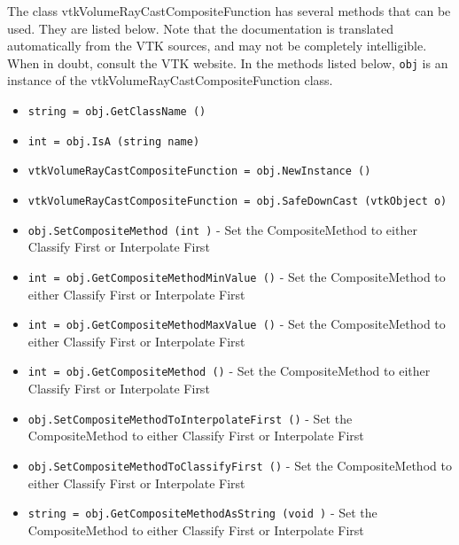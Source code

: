 The class vtkVolumeRayCastCompositeFunction has several methods that can be used.
  They are listed below.
Note that the documentation is translated automatically from the VTK sources,
and may not be completely intelligible.  When in doubt, consult the VTK website.
In the methods listed below, \verb|obj| is an instance of the vtkVolumeRayCastCompositeFunction class.
\begin{itemize}
\item  \verb|string = obj.GetClassName ()|

\item  \verb|int = obj.IsA (string name)|

\item  \verb|vtkVolumeRayCastCompositeFunction = obj.NewInstance ()|

\item  \verb|vtkVolumeRayCastCompositeFunction = obj.SafeDownCast (vtkObject o)|

\item  \verb|obj.SetCompositeMethod (int )| -  Set the CompositeMethod to either Classify First or Interpolate First

\item  \verb|int = obj.GetCompositeMethodMinValue ()| -  Set the CompositeMethod to either Classify First or Interpolate First

\item  \verb|int = obj.GetCompositeMethodMaxValue ()| -  Set the CompositeMethod to either Classify First or Interpolate First

\item  \verb|int = obj.GetCompositeMethod ()| -  Set the CompositeMethod to either Classify First or Interpolate First

\item  \verb|obj.SetCompositeMethodToInterpolateFirst ()| -  Set the CompositeMethod to either Classify First or Interpolate First

\item  \verb|obj.SetCompositeMethodToClassifyFirst ()| -  Set the CompositeMethod to either Classify First or Interpolate First

\item  \verb|string = obj.GetCompositeMethodAsString (void )| -  Set the CompositeMethod to either Classify First or Interpolate First

\end{itemize}
